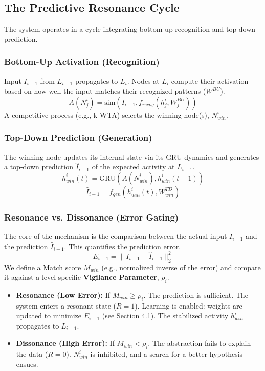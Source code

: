 \documentclass{article}
\begin{document}
\subsection{The Predictive Resonance Cycle}
The system operates in a cycle integrating bottom-up recognition and top-down prediction.

\subsubsection{Bottom-Up Activation (Recognition)}
Input $I_{i-1}$ from $L_{i-1}$ propagates to $L_i$. Nodes at $L_i$ compute their activation based on how well the input matches their recognized patterns ($W^{BU}$).
\begin{equation}
A(N_j^i) = \text{sim}(I_{i-1}, f_{recog}(h_j^i, W_j^{BU}))
\end{equation}
A competitive process (e.g., k-WTA) selects the winning node(s), $N_{win}^i$.

\subsubsection{Top-Down Prediction (Generation)}
The winning node updates its internal state via its GRU dynamics and generates a top-down prediction $\hat{I}_{i-1}$ of the expected activity at $L_{i-1}$.
\begin{equation}
h_{win}^i(t) = \text{GRU}(A(N_{win}^i), h_{win}^i(t-1))
\end{equation}
\begin{equation}
\hat{I}_{i-1} = f_{gen}(h_{win}^i(t), W_{win}^{TD})
\end{equation}

\subsubsection{Resonance vs. Dissonance (Error Gating)}
The core of the mechanism is the comparison between the actual input $I_{i-1}$ and the prediction $\hat{I}_{i-1}$. This quantifies the prediction error.
\begin{equation}
E_{i-1} = \| I_{i-1} - \hat{I}_{i-1} \|_2^2
\end{equation}
We define a Match score $M_{win}$ (e.g., normalized inverse of the error) and compare it against a level-specific \textbf{Vigilance Parameter}, $\rho_i$.

\begin{itemize}
    \item \textbf{Resonance (Low Error):} If $M_{win} \geq \rho_i$. The prediction is sufficient. The system enters a resonant state ($R=1$). Learning is enabled: weights are updated to minimize $E_{i-1}$ (see Section 4.1). The stabilized activity $h_{win}^i$ propagates to $L_{i+1}$.
    \item \textbf{Dissonance (High Error):} If $M_{win} < \rho_i$. The abstraction fails to explain the data ($R=0$). $N_{win}^i$ is inhibited, and a search for a better hypothesis ensues.
\end{itemize}
\end{document}
